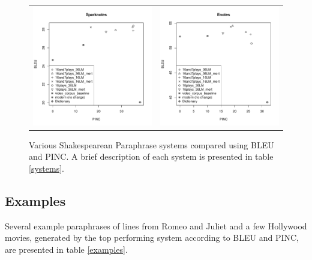 \documentclass[10pt,a5paper,twoside]{article}
\begin{document}
\begin{figure}
  \begin{center}
    \begin{tabular}{cc}
      \includegraphics[width=2.4in]{figures/bleupinc1.pdf} & \includegraphics[width=2.4in]{figures/bleupinc2.pdf} \\
    \end{tabular}
  \end{center}
  \caption{Various Shakespearean Paraphrase systems compared using BLEU and PINC.  A brief description of each system is presented in table \ref{systems}.}
  \label{bleupinc}
\end{figure}

\subsection{Examples}
Several example paraphrases of lines from Romeo and Juliet and a few Hollywood movies, generated by the top performing system according to BLEU and PINC, are presented in table \ref{examples}.
\end{document}
